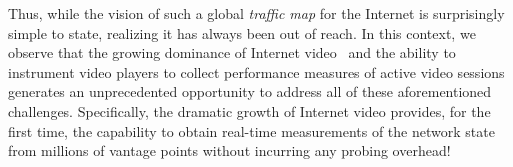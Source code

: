 \begin{figure}[t!]
\centering
{}
\hspace{-0.5cm}
\hspace{-0.5cm}
\vspace{-0.2cm}
\label{fig:video:client-coverage}
\end{figure}

Thus, while the vision of such a global {\em traffic map} for the Internet is
surprisingly simple to state, realizing it has always been out of reach. In
this context, we observe that the growing dominance of Internet video~\cite{interne-traffic-report} and the
ability to instrument video players to collect performance measures of active
video sessions~\cite{de2010experimental}\cite{festive} generates  an unprecedented opportunity to address all
of these aforementioned challenges. Specifically, the dramatic growth of
Internet video provides, for the first time, the capability to obtain real-time
measurements of the network state from millions of vantage points without
incurring any probing overhead!


